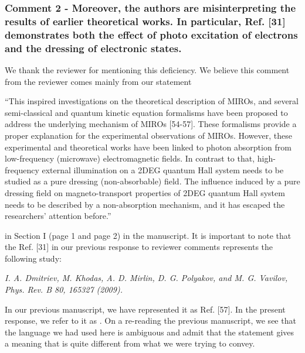 \documentclass{article}
\begin{document}
\subsubsection*{Comment 2 -
\color{RoyalBlue} Moreover, the authors are misinterpreting the results of earlier theoretical works. In particular, Ref. [31] demonstrates both the effect of photo excitation of electrons and the dressing of electronic states.}

We thank the reviewer for mentioning this deficiency. We believe this comment from the reviewer comes mainly from our statement

{\color{CadetBlue} “This inspired investigations on the theoretical description of MIROs, and several semi-classical and quantum kinetic equation formalisms have been proposed to address the underlying mechanism of MIROs [54-57]. These formalisms provide a proper explanation for the experimental observations of MIROs. However, these experimental and theoretical works have been linked to photon absorption from low-frequency (microwave) electromagnetic fields.
In contrast to that, high-frequency external illumination on a 2DEG quantum Hall system needs to be studied as a pure dressing (non-absorbable) field.
The influence induced by a pure dressing field on
magneto-transport properties of 2DEG quantum Hall system needs to be described by a non-absorption mechanism, and it has escaped the researchers’ attention before.”}

in Section I (page 1 and page 2) in the manuscript. It is important to note that the Ref. [31] in our previous response to reviewer comments represents the following study:

\textit{I. A. Dmitriev, M. Khodas, A. D. Mirlin, D. G. Polyakov, and M. G. Vavilov, Phys. Rev. B 80, 165327 (2009).}

In our previous manuscript, we have represented it as Ref. [57]. In the present response, we refer to it as \cite{dmitriev09}.
On a re-reading the previous manuscript, we see that the language we had used here is ambiguous and admit that the statement gives a meaning that is quite different from what we were trying to convey.
\end{document}

